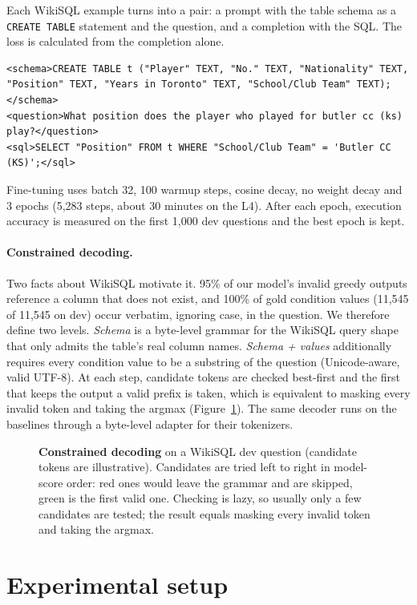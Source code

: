 \documentclass[11pt]{article}
\begin{document}
Each WikiSQL example turns into a pair: a prompt with the table schema as a \texttt{CREATE TABLE} statement and the question, and a completion with the SQL. The loss is calculated from the completion alone.
\begin{lstlisting}
<schema>CREATE TABLE t ("Player" TEXT, "No." TEXT, "Nationality" TEXT, "Position" TEXT, "Years in Toronto" TEXT, "School/Club Team" TEXT);</schema>
<question>What position does the player who played for butler cc (ks) play?</question>
<sql>SELECT "Position" FROM t WHERE "School/Club Team" = 'Butler CC (KS)';</sql>
\end{lstlisting}
Fine-tuning uses batch 32, 100 warmup steps, cosine decay, no weight decay and 3 epochs (5,283 steps, about 30 minutes on the L4). After each epoch, execution accuracy is measured on the first 1,000 dev questions and the best epoch is kept.

\paragraph{Constrained decoding.} Two facts about WikiSQL motivate it. 95\% of our model's invalid greedy outputs reference a column that does not exist, and 100\% of gold condition values (11,545 of 11,545 on dev) occur verbatim, ignoring case, in the question. We therefore define two levels. \emph{Schema} is a byte-level grammar for the WikiSQL query shape that only admits the table's real column names. \emph{Schema + values} additionally requires every condition value to be a substring of the question (Unicode-aware, valid UTF-8). At each step, candidate tokens are checked best-first and the first that keeps the output a valid prefix is taken, which is equivalent to masking every invalid token and taking the argmax (Figure~\ref{fig:constrained}). The same decoder runs on the baselines through a byte-level adapter for their tokenizers.

\begin{figure}[!htbp]
\centering
\resizebox{0.95\linewidth}{!}{}
\caption{\textbf{Constrained decoding} on a WikiSQL dev question (candidate tokens are illustrative). Candidates are tried left to right in model-score order: red ones would leave the grammar and are skipped, green is the first valid one. Checking is lazy, so usually only a few candidates are tested; the result equals masking every invalid token and taking the argmax.}
\label{fig:constrained}
\end{figure}

\section{Experimental setup}
\label{sec:setup}
\end{document}
